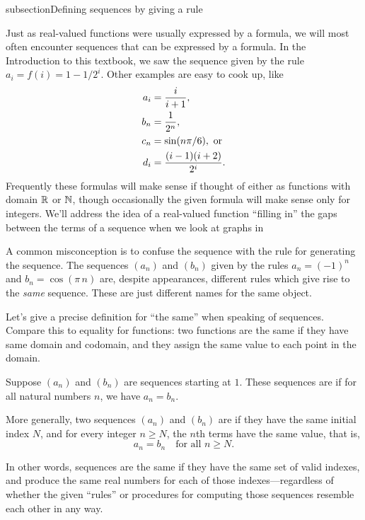 \documentclass{ximera}
\begin{document}
subsection{Defining sequences by giving a rule}

Just as real-valued functions were usually expressed by a formula, we
will most often encounter sequences that can be expressed by a
formula.  In the Introduction to this textbook, we saw the sequence
given by the rule $a_i=f(i)=1-1/2^i$.  Other examples are easy to
cook up, like
\begin{align*}
  a_i &={i\over i+1}, \\
  b_n &={1\over2^n}, \\
  c_n &=\sin(n\pi/6), \mbox{ or} \\
  d_i &={(i-1)(i+2)\over2^i}. \\
\end{align*}
Frequently these formulas will make sense if thought of either as
functions with domain $\mathbb R$ or $\mathbb N$, though occasionally the given
formula will make sense only for integers.  We'll address the
idea of a real-valued function ``filling in'' the gaps between the
terms of a sequence when we look at graphs in

\begin{warning}
  A common misconception is to confuse the sequence with the rule for
  generating the sequence.  The sequences $(a_n)$ and $(b_n)$ given by
  the rules $a_n = (-1)^n$ and $b_n = \cos (\pi \, n)$ are, despite
  appearances, different rules which give rise to the \textit{same}
  sequence.  These are just different names for the same object.
\end{warning}

Let's give a precise definition for ``the same'' when speaking of
sequences.  Compare this to equality for functions: two functions are
the same if they have same domain and codomain, and they assign the
same value to each point in the domain.


\begin{definition}
  Suppose $(a_n)$ and $(b_n)$ are sequences starting at $1$.  These
  sequences are  if for all
  natural numbers $n$, we have $a_n = b_n$.

  More generally, two sequences $(a_n)$ and $(b_n)$ are
   if they have the same initial index $N$, and for
  every integer $n \geq N$, the $n$th terms have the same value, that is,
  \[
  a_n = b_n \quad \mbox{for all $n \geq N$.}
  \]
\end{definition}
In other words, sequences are the same if they have the same set of
valid indexes, and produce the same real numbers for each of those
indexes---regardless of whether the given ``rules'' or procedures for
computing those sequences resemble each other in any way.
\end{document}

